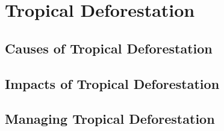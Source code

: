 \documentclass[../main]{subfiles}
\begin{document}
\section{Tropical Deforestation}

	\subsection{Causes of Tropical Deforestation}

	\subsection{Impacts of Tropical Deforestation}

	\subsection{Managing Tropical Deforestation}
\end{document}
